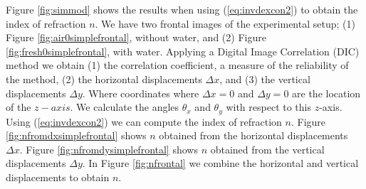 \documentclass{article}
\begin{document}

Figure \ref{fig:simmod} shows the results when using (\ref{eq:invdexcon2}) to obtain the index of refraction $n$. We have two frontal images of the experimental setup; (1) Figure \ref{fig:air0simplefrontal}, without water, and (2) Figure \ref{fig:fresh0simplefrontal}, with water.  Applying a Digital Image Correlation (DIC) method we obtain (1) the correlation coefficient, a measure of the reliability of the method, (2) the horizontal displacements $\Delta x$, and (3) the vertical displacements $\Delta y$. Where coordinates where $\Delta x = 0$ and $\Delta y = 0$ are the location of the $z-axis$. We calculate the angles $\theta_x$ and $\theta_y$ with respect to this $z$-axis. Using (\ref{eq:invdexcon2}) we can compute the index of refraction $n$. Figure \ref{fig:nfromdxsimplefrontal} shows $n$ obtained from the horizontal displacements $\Delta x$.  Figure \ref{fig:nfromdysimplefrontal} shows $n$ obtained from the vertical displacements $\Delta y$. In Figure \ref{fig:nfrontal} we combine the horizontal and vertical displacements to obtain $n$.
\end{document}
